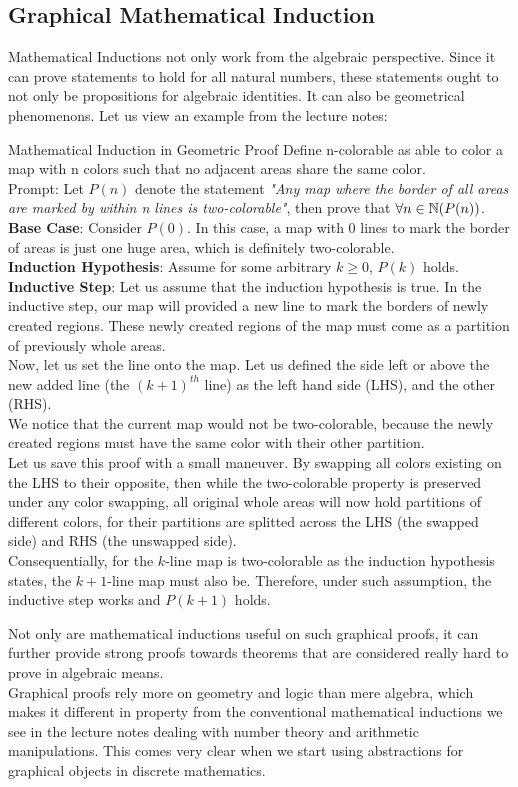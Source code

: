\subsection{Graphical Mathematical Induction}
Mathematical Inductions not only work from the algebraic perspective. Since it can prove statements to hold for all natural numbers, these statements ought to not only be propositions for algebraic identities. It can also be geometrical phenomenons. Let us view an example from the lecture notes:
\begin{ln-think}{Mathematical Induction in Geometric Proof}{}
    Define n-colorable as able to color a map with n colors such that no adjacent areas share the same color. \\
    Prompt: Let $P(n)$ denote the statement \textit{"Any map where the border of all areas are marked by within n lines is two-colorable"}, then prove that $\forall n \in \mathbb{N} (P(n))$.
    \tcblower
    \textbf{Base Case}: Consider $P(0)$. In this case, a map with $0$ lines to mark the border of areas is just one huge area, which is definitely two-colorable. \\
    \textbf{Induction Hypothesis}: Assume for some arbitrary $k \geq 0$, $P(k)$ holds. \\
    \textbf{Inductive Step}: Let us assume that the induction hypothesis is true. In the inductive step, our map will provided a new line to mark the borders of newly created regions. These newly created regions of the map must come as a partition of previously whole areas. \\
    Now, let us set the line onto the map. Let us defined the side left or above the new added line (the $(k + 1)^{th}$ line) as the left hand side (LHS), and the other (RHS). \\
    We notice that the current map would not be two-colorable, because the newly created regions must have the same color with their other partition. \\
    Let us save this proof with a small maneuver. By swapping all colors existing on the LHS to their opposite, then while the two-colorable property is preserved under any color swapping, all original whole areas will now hold partitions of different colors, for their partitions are splitted across the LHS (the swapped side) and RHS (the unswapped side). \\
    Consequentially, for the $k$-line map is two-colorable as the induction hypothesis states, the $k + 1$-line map must also be. Therefore, under such assumption, the inductive step works and $P(k + 1)$ holds.
\end{ln-think}
Not only are mathematical inductions useful on such graphical proofs, it can further provide strong proofs towards theorems that are considered really hard to prove in algebraic means. \\
Graphical proofs rely more on geometry and logic than mere algebra, which makes it different in property from the conventional mathematical inductions we see in the lecture notes dealing with number theory and arithmetic manipulations. This comes very clear when we start using abstractions for graphical objects in discrete mathematics.

